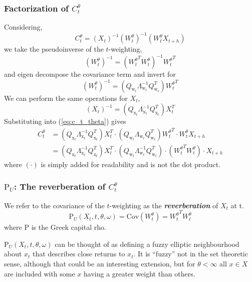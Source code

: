 \documentclass{article}
\newcommand{\X}{\text{x}}
\newcommand{\W}{\text{w}}
\newcommand{\Rho}{\mathrm{P}}
\begin{document}
\subsubsection{Factorization of $C_t^\theta$}
Considering,
\begin{equation}
    C_t^\theta = (X_t)^{-1} ({W_t^\theta})^{-1} (W_t^\theta X_{t+h}) \label{eq:c_t_theta}
\end{equation}
we take the pseudoinverse of the $t$-weighting, 
$$
    ({W_t^\theta})^{-1} = ({W_t^\theta}^T W_t^\theta)^{-1} {W_t^\theta}^T
$$
and eigen decompose the covariance term and invert for
$$
    ({W_t^\theta})^{-1} = (Q_{\W_t} \Lambda_{\W_t}^{-1} Q_{\W_t}^T)  {W_t^\theta}^T
$$
We can perform the same operations for $X_t$,
$$
    (X_t)^{-1} = (Q_{\X_t} \Lambda_{\X_t}^{-1} Q_{\X_t}^T) X_t^T 
$$
Substituting into (\ref{eq:c_t_theta}) gives
\begin{align}
        C_t^\theta &= (Q_{\X_t} \Lambda_{\X_t}^{-1} Q_{\X_t}^T) X_t^T \cdot (Q_{\W_t} \Lambda_{\W_t} Q_{\W_t}^T) {W_t^\theta}^T \cdot {W_t^\theta} X_{t+h} \nonumber \\
        &= (Q_{\X_t} \Lambda_{\X_t}^{-1} Q_{\X_t}^T) X_t^T \cdot (Q_{\W_t} \Lambda_{\W_t}^{-1} Q_{\W_t}^T) \cdot ({W_t^\theta}^T  {W_t^\theta}) \cdot X_{t+h} \label{eq:c_t_expansion}
\end{align}
where $(\cdot)$ is simply added for readability and is not the dot product.

\subsubsection{$\Rho_U$: The reverberation of $C_t^\theta$}
We refer to the covariance of the $t$-weighting as the \textbf{\textit{reverberation}} of $X_t$ at t. 
$$
    \Rho_U(X_t, t, \theta, \omega) = \text{Cov}(W_t^\theta) = {W_t^\theta}^T{W_t^\theta}
$$
where $\Rho$ is the Greek capital rho. 

$\Rho_U(X_t, t, \theta, \omega)$ can be thought of as defining a fuzzy elliptic neighbourhood about $x_t$ that describes close returns to $x_t$. It is ``fuzzy'' not in the set theoretic sense, although that could be an interesting extension, but for $\theta < \infty$ all $x\in X$ are included with some $x$ having a greater weight than others.
\end{document}
